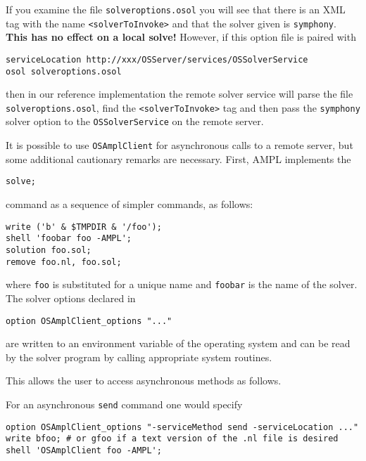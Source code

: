 If you examine the file {\tt solveroptions.osol} you will see that there is an XML tag  with the name
{\tt <solverToInvoke>} and that the solver given is {\tt symphony}.   
{\bf This has no effect on a local solve!} However, if this option file is paired with 

\begin{verbatim}
serviceLocation http://xxx/OSServer/services/OSSolverService
osol solveroptions.osol
\end{verbatim}
then in our reference implementation the remote solver service will parse the file {\tt solveroptions.osol}, find the {\tt <solverToInvoke>} tag and then pass the {\tt symphony} solver option to the {\tt OSSolverService} on the remote server.


\ifbible

\label{section:amplclient_async}

It is possible to use {\tt OSAmplClient} for asynchronous calls to a remote server, but some additional cautionary remarks are necessary. First, AMPL implements the

\begin{verbatim}
solve;
\end{verbatim}

\noindent command as a sequence of simpler commands, as follows:

\begin{verbatim}
write ('b' & $TMPDIR & '/foo');
shell 'foobar foo -AMPL';
solution foo.sol;
remove foo.nl, foo.sol;
\end{verbatim}

\noindent where {\tt foo} is substituted for a unique name and {\tt foobar} is the name of the solver. The solver options declared in

\begin{verbatim}
option OSAmplClient_options "..."
\end{verbatim}

\noindent are written to an environment variable of the operating system and can be read by the solver program by calling appropriate system routines.

This allows the user to access asynchronous methods as follows.

For an asynchronous {\tt send} command one would specify

\begin{verbatim}
option OSAmplClient_options "-serviceMethod send -serviceLocation ..."
write bfoo; # or gfoo if a text version of the .nl file is desired
shell 'OSAmplClient foo -AMPL';
\end{verbatim}

